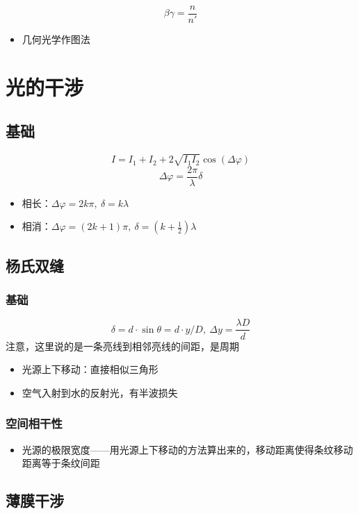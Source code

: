 \documentclass{article}
\begin{document}
$$
    \beta\gamma=\frac{n}{n'}
$$

\begin{itemize}
    \item 几何光学作图法
\end{itemize}

\section{光的干涉}

\subsection{基础}

$$
    I=I_1+I_2+2\sqrt{I_1I_2}\cos(\Delta\varphi)
$$ $$
    \Delta\varphi=\frac{2\pi}{\lambda}\delta
$$ \begin{itemize}
    \item 相长：$\Delta\varphi=2k\pi,\ \delta=k\lambda$
    \item 相消：$\Delta\varphi=(2k+1)\pi,\ \delta=(k+\frac{1}{2})\lambda$
\end{itemize}

\subsection{杨氏双缝}

\subsubsection{基础}

$$
    \delta=d\cdot\sin\theta=d\cdot y/D,\ \Delta y=\frac{\lambda D}{d}
$$
注意，这里说的是一条亮线到相邻亮线的间距，是周期 \begin{itemize}
    \item 光源上下移动：直接相似三角形
    \item 空气入射到水的反射光，有半波损失
\end{itemize}

\subsubsection{空间相干性}

\begin{itemize}
    \item 光源的极限宽度——用光源上下移动的方法算出来的，移动距离使得条纹移动距离等于条纹间距
\end{itemize}

\subsection{薄膜干涉}
\end{document}
